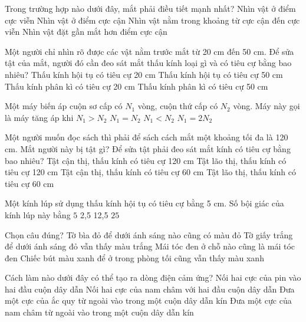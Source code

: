 \begin{ex}
	Trong trường hợp nào dưới đây, mắt phải điều tiết mạnh nhất?
	\choice
	{Nhìn vật ở điểm cực viễn}
	{\True Nhìn vật ở điểm cực cận}
	{Nhìn vật nằm trong khoảng từ cực cận đến cực viễn}
	{Nhìn vật đặt gần mắt hơn điểm cực cận}
	\loigiai{}
\end{ex}

\begin{ex}
	Một người chỉ nhìn rõ được các vật nằm trước mắt từ 20 cm đến 50 cm. Để sửa tật của mắt, người đó cần đeo sát mắt thấu kính loại gì và có tiêu cự bằng bao nhiêu?
	\choice
	{Thấu kính hội tụ có tiêu cự 20 cm}
	{Thấu kính hội tụ có tiêu cự 50 cm}
	{Thấu kính phân kì có tiêu cự 20 cm}
	{\True Thấu kính phân kì có tiêu cự 50 cm}
	\loigiai{}
\end{ex}

\begin{ex}
	Một máy biến áp cuộn sơ cấp có $N_1$ vòng, cuộn thứ cấp có $N_2$ vòng. Máy này gọi là máy tăng áp khi
	\choice
	{$N_1 > N_2$}
	{$N_1=N_2$}
	{\True $N_1 < N_2$}
	{$N_1=2N_2$}
	\loigiai{}
\end{ex}
\begin{ex}
	Một người muốn đọc sách thì phải để sách cách mắt một khoảng tối đa là 120 cm. Mắt người này bị tật gì? Để sửa tật phải đeo sát mắt kính có tiêu cự bằng bao nhiêu?
	\choice
	{Tật cận thị, thấu kính có tiêu cự 120 cm}
	{\True Tật lão thị, thấu kính có tiêu cự 120 cm}
	{Tật cận thị, thấu kính có tiêu cự 60 cm}
	{Tật lão thị, thấu kính có tiêu cự 60 cm}
	\loigiai{}
\end{ex}

\begin{ex}
	Một kính lúp sử dụng thấu kính hội tụ có tiêu cự bằng 5 cm. Số bội giác của kính lúp này bằng
	\choice
	{\True $5$}
	{2,5}
	{12,5}
	{$25$}
	\loigiai{}
\end{ex}

\begin{ex}
	Chọn câu đúng?
	\choice
	{Tờ bìa đỏ để dưới ánh sáng nào cũng có màu đỏ}
	{Tờ giấy trắng để dưới ánh sáng đỏ vẫn thấy màu trắng}
	{\True Mái tóc đen ở chỗ nào cũng là mái tóc đen}
	{Chiếc bút màu xanh để ở trong phòng tối cũng vẫn thấy màu xanh}
	\loigiai{}
\end{ex}

\begin{ex}
	Cách làm nào dưới đây có thể tạo ra dòng điện cảm ứng?
	\choice
	{Nối hai cực của pin vào hai đầu cuộn dây dẫn}
	{Nối hai cực của nam châm với hai đầu cuộn dây dẫn}
	{Đưa một cực của ắc quy từ ngoài vào trong một cuộn dây dẫn kín}
	{\True Đưa một cực của nam châm từ ngoài vào trong một cuộn dây dẫn kín}
	\loigiai{}
\end{ex}


